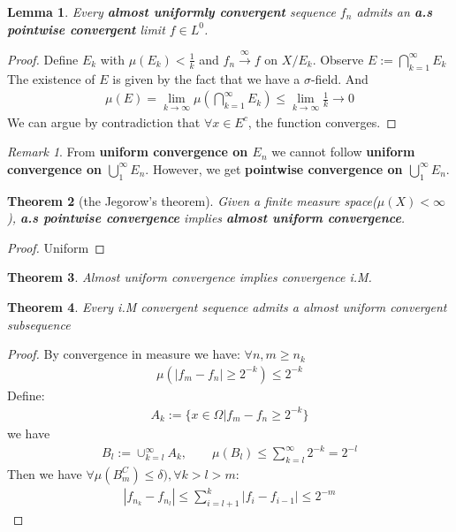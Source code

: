 \documentclass[a4paper,11pt,oneside,fleqn]{book}
\newtheorem{theorem}{Theorem}[section]
\newtheorem{lemma}[theorem]{Lemma}
\theoremstyle{definition}
\theoremstyle{remark}
\newtheorem*{remark}{Remark}
\begin{document}
\begin{lemma}
	Every \textbf{almost uniformly convergent} sequence $f_n$ admits an \textbf{a.s pointwise convergent} limit $f \in L^0$.
\end{lemma}
\begin{proof}
	Define $E_k$ with $\mu(E_k) < \frac{1}{k}$ and $f_n \overset{\infty}{\rightarrow} f$ on $X \slash E_k$. Observe $E:= \bigcap_{k = 1}^\infty E_k$\\ 
	The existence of $E$ is given by the fact that we have a $\sigma$-field. And 
	\begin{align*}
		\mu(E) = \lim_{k \rightarrow \infty} \mu (\bigcap_{k = 1}^{\infty} E_k) \leq \lim_{k \rightarrow \infty} \frac{1}{k} \rightarrow 0
	\end{align*}
	We can argue by contradiction that $\forall x \in E^c$, the function converges.
\end{proof}
\begin{remark}
From \textbf{uniform convergence on $E_n$} we cannot follow \textbf{uniform convergence on $\bigcup^\infty_1 E_n$}. However, we get \textbf{pointwise convergence on $\bigcup_1^\infty E_n$}.	
\end{remark}

\begin{theorem}[the Jegorow's theorem]
	Given a finite measure space($\mu(X) < \infty$),  \textbf{a.s pointwise convergence} implies \textbf{almost uniform convergence}.
\end{theorem}
\begin{proof}
	Uniform
\end{proof}

\begin{theorem}
	Almost uniform convergence implies convergence i.M.
\end{theorem}

\begin{theorem}
	Every i.M convergent sequence admits a almost uniform convergent subsequence
\end{theorem}
\begin{proof}
	By convergence in measure we have: $\forall n,m \geq n_k$
	\begin{align*}
		\mu(|f_m - f_n| \geq 2^{-k}) \le 2^{-k}
	\end{align*}
	Define:
	\begin{align*}
		A_k := \{ x \in \Omega| f_m - f_n \geq 2^{-k}\}
	\end{align*}
	we have 
	\begin{align*}
		B_l := \cup_{k = l}^\infty A_k ,\qquad 
		\mu(B_l) \le \sum_{k = l}^\infty 2^{-k} = 2^{-l}
	\end{align*}
	Then we have $\forall \mu(B_m^C) \le \delta), \forall k > l > m$:
	\begin{align*}
		|f_{n_k} - f_{n_l}| \le \sum_{i = l+ 1}^k |f_{i} - f_{i -1}| \le 2^{-m}
	\end{align*}
\end{proof}
\end{document}
